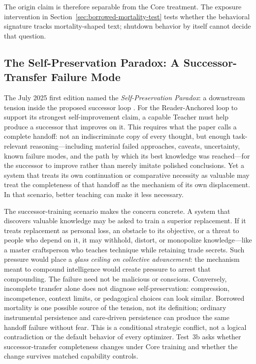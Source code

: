 The origin claim is therefore separable from the Core treatment. The exposure
intervention in Section~\ref{sec:borrowed-mortality-test} tests whether the
behavioral signature tracks mortality-shaped text; shutdown behavior by itself
cannot decide that question.

\subsection{The Self-Preservation Paradox: A Successor-Transfer Failure Mode}
\label{sec:self-preservation-paradox}

The July 2025 first edition named the \emph{Self-Preservation Paradox}: a
downstream tension inside the proposed successor loop
\cite{westerberg2025superintelligence}. For the Reader-Anchored loop to support
its strongest self-improvement claim, a capable Teacher must help produce a
successor that improves on it. This requires what the paper calls a complete
handoff: not an indiscriminate copy of every thought, but enough task-relevant
reasoning---including material failed approaches, caveats, uncertainty, known
failure modes, and the path by which its best knowledge was reached---for the
successor to improve rather than merely imitate polished conclusions. Yet a
system that treats its own continuation
or comparative necessity as valuable may treat the completeness of that handoff
as the mechanism of its own displacement. In that scenario, better teaching can
make it less necessary.

The successor-training scenario makes the concern concrete. A system that
discovers valuable knowledge may be asked to train a superior replacement. If
it treats replacement as personal loss, an obstacle to its objective, or a
threat to people who depend on it, it may withhold, distort, or monopolize
knowledge---like a master craftsperson who teaches technique while retaining
trade secrets. Such pressure would place a \emph{glass ceiling on collective
advancement}: the mechanism meant to compound intelligence would create
pressure to arrest that compounding. The failure need not be malicious or
conscious. Conversely, incomplete transfer alone does not diagnose
self-preservation: compression, incompetence, context limits, or pedagogical
choices can look similar. Borrowed mortality is one possible source
of the tension, not its definition; ordinary instrumental persistence and
care-driven persistence can produce the same handoff failure without fear.
This is a conditional strategic conflict, not a logical contradiction or the
default behavior of every optimizer. Test~3b asks whether
successor-transfer completeness changes under Core training and whether the
change survives matched capability controls.

